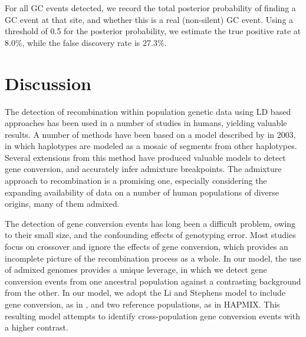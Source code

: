 For all GC events detected, we record the total posterior probability of finding a GC event at that site, and whether this is a real (non-silent) GC event.
Using a threshold of 0.5 for the posterior probability, we estimate the true positive rate at 8.0\%, while the false discovery rate is 27.3\%. %




\section{Discussion}

The detection of recombination within population genetic data using LD based approaches has been used in a number of studies in humans, yielding valuable results\cite{Mcvean2004,Myers2005,hapmap2007}.
A number of methods have been based on a model described by \citet{Li2003} in 2003, in which haplotypes are modeled as a mosaic of segments from other haplotypes.
Several extensions from this method have produced valuable models to detect gene conversion\cite{Gay2007}, and accurately infer admixture breakpoints\cite{Price2009,Hinch2011}.
The admixture approach to recombination is a promising one, especially considering the expanding availability of data on a number of human populations of diverse origins, many of them admixed.

The detection of gene conversion events has long been a difficult problem, owing to their small size, and the confounding effects of genotyping error.
Most studies focus on crossover and ignore the effects of gene conversion, which provides an incomplete picture of the recombination process as a whole.
In our model, the use of admixed genomes provides a unique leverage, in which we detect gene conversion events from one ancestral population against a contrasting background from the other.
In our model, we adopt the Li and Stephens model to include gene conversion, as in \citet{Gay2007}, and two reference populations, as in HAPMIX\cite{Price2009}.
This resulting model attempts to identify cross-population gene conversion events with a higher contrast.

